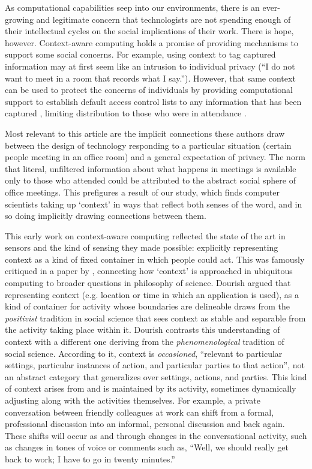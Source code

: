\documentclass[../thesis.tex]{subfiles}
\begin{document}
As computational
capabilities seep into our environments, there is an ever-growing and
legitimate concern that technologists are not spending enough of their
intellectual cycles on the social implications of their work. There is
hope, however. Context-aware computing holds a promise of providing
mechanisms to support some social concerns. For example, using context
to tag captured information may at first seem like an intrusion to
individual privacy (``I do not want to meet in a room
that records what I say.''). However, that same
context can be used to protect the concerns of individuals by providing
computational support to establish default access control
lists to any
information that has been captured \cite{lau1999privacy},
limiting distribution to those who were in
attendance \cite{dey2001conceptual}.

Most relevant to this
article are the implicit connections these authors draw between the
design of technology responding to a particular situation
(certain people meeting in an office room)
and a general expectation of
privacy. The norm that literal, unfiltered information about what
happens in meetings is available only to those who attended could be
attributed to the abstract social sphere
of office meetings. This prefigures a result of our study, which finds
computer scientists taking up `context'
in ways that reflect both senses of the word, and in so doing
implicitly drawing connections between them.

This early work on context-aware computing reflected the state of the
art in sensors and the kind of sensing they made possible: explicitly
representing context as a kind of fixed container in which people could
act. This was famously critiqued in a paper by \citet{dourish2004we},
connecting how `context' is approached
in ubiquitous computing to broader questions in philosophy of science.
Dourish argued that representing context (e.g. location or time in
which an application is used), as a kind of container for activity
whose boundaries are delineable draws from the \textit{positivist}
tradition in social science that sees context as stable and separable
from the activity taking place within it. Dourish contrasts this
understanding of context with a different one deriving from the
\textit{phenomenological} tradition of social science.
According to it,
context is \textit{occasioned}, ``relevant to
particular settings, particular instances of action, and particular
parties to that action'', not an abstract category
that generalizes over settings, actions, and parties. This kind of
context arises from and is maintained by its activity, sometimes
dynamically adjusting along with the activities themselves. For
example, a private conversation between friendly
colleagues at work can
shift from a formal, professional discussion into an
informal, personal
discussion and back again. These shifts will occur as and through
changes in the conversational activity, such as changes in tones of
voice or comments such as, ``Well, we should really
get back to work; I have to go in twenty minutes.''
\end{document}
